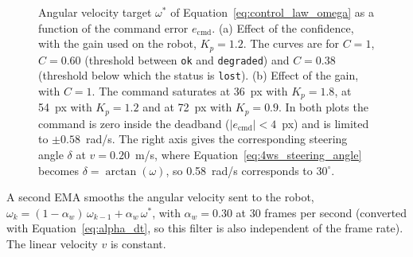 \begin{figure}[H]
    \vspace{6pt}
    \caption{Angular velocity target $\omega^{*}$ of Equation~\eqref{eq:control_law_omega} as a function of the command error $e_{\mathrm{cmd}}$. (a) Effect of the confidence, with the gain used on the robot, $K_p = 1.2$. The curves are for $C = 1$, $C = 0.60$ (threshold between \texttt{ok} and \texttt{degraded}) and $C = 0.38$ (threshold below which the status is \texttt{lost}). (b) Effect of the gain, with $C = 1$. The command saturates at 36~px with $K_p = 1.8$, at 54~px with $K_p = 1.2$ and at 72~px with $K_p = 0.9$. In both plots the command is zero inside the deadband ($|e_{\mathrm{cmd}}| < 4$~px) and is limited to $\pm 0.58$~rad/s. The right axis gives the corresponding steering angle $\delta$ at $v = 0.20$~m/s, where Equation~\eqref{eq:4ws_steering_angle} becomes $\delta = \arctan(\omega)$, so 0.58~rad/s corresponds to $30^\circ$.}
    \label{fig:steering_law}
\end{figure}

A second EMA smooths the angular velocity sent to the robot, $\omega_k = (1 - \alpha_w)\,\omega_{k-1} + \alpha_w\,\omega^{*}$, with $\alpha_w = 0.30$ at 30 frames per second (converted with Equation~\eqref{eq:alpha_dt}, so this filter is also independent of the frame rate). The linear velocity $v$ is constant.



